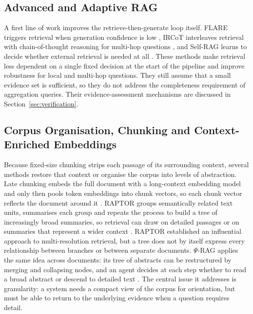 \documentclass[11pt,letterpaper,oneside]{report}
\begin{document}
\subsection{Advanced and Adaptive RAG}
A first line of work improves the retrieve-then-generate loop itself. FLARE
triggers retrieval when generation confidence is low \citep{jiang2023flare},
IRCoT interleaves retrieval with chain-of-thought reasoning for multi-hop
questions \citep{trivedi2023ircot}, and Self-RAG learns to decide whether
external retrieval is needed at all \citep{asai2024selfrag}. These methods
make retrieval less dependent on a single fixed decision at the start of the
pipeline and improve robustness for local and multi-hop questions. They still
assume that a small evidence set is sufficient, so they do not address the
completeness requirement of aggregation queries. Their evidence-assessment
mechanisms are discussed in Section~\ref{sec:verification}.

\subsection{Corpus Organisation, Chunking and Context-Enriched Embeddings}
\label{sec:organisation-rw}
Because fixed-size chunking strips each passage of its surrounding context,
several methods restore that context or organise the corpus into levels of
abstraction. Late chunking embeds the full document with a long-context
embedding model and only then pools token embeddings into chunk vectors, so
each chunk vector reflects the document around it
\citep{gunther2024latechunking}. RAPTOR groups semantically related text
units, summarises each group and repeats the process to build a tree of
increasingly broad summaries, so retrieval can draw on detailed passages or
on summaries that represent a wider context \citep{sarthi2024raptor}. RAPTOR
established an influential approach to multi-resolution retrieval, but a tree
does not by itself express every relationship between branches or between
separate documents. $\Psi$-RAG applies the same idea across documents: its tree of abstracts can
be restructured by merging and collapsing nodes, and an agent decides at each
step whether to read a broad abstract or descend to detailed text
\citep{zhao2026psirag}. The central issue it addresses is
granularity: a system needs a compact view of the corpus for orientation, but
must be able to return to the underlying evidence when a question requires
detail.
\end{document}
